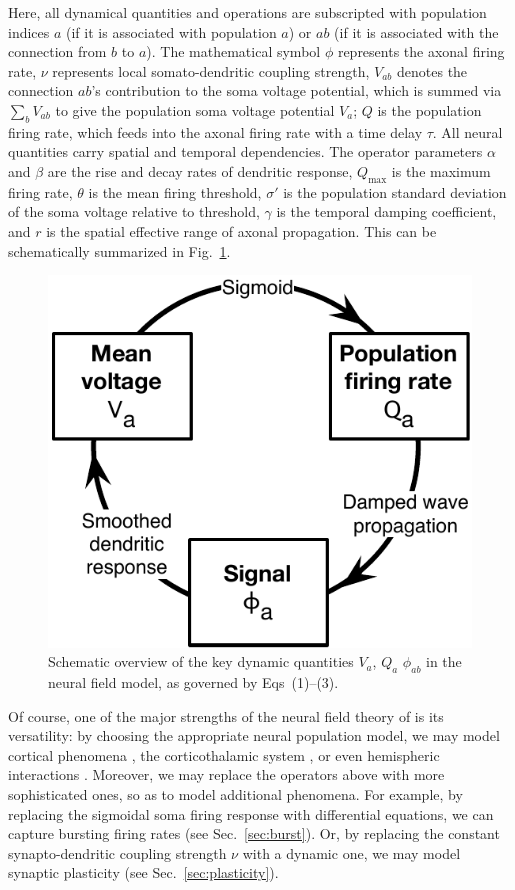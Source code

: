 \documentclass[preprint,review,10pt,authoryear,letterpaper]{elsarticle}
\begin{document}
Here, all dynamical quantities and operations are subscripted with population indices \(a\) (if it is associated with population \(a\)) or \(ab\) (if it is associated with the connection from \(b\) to \(a\)). The mathematical symbol \(\phi\) represents the axonal firing rate, \(\nu\) represents local somato-dendritic coupling strength, \(V_{ab}\) denotes the connection \(ab\)'s contribution to the soma voltage potential, which is summed via \(\sum_b V_{ab}\) to give the population soma voltage potential \(V_a\); \(Q\) is the population firing rate, which feeds into the axonal firing rate with a time delay \(\tau\). All neural quantities carry spatial and temporal dependencies. The operator parameters \(\alpha\) and \(\beta\) are the rise and decay rates of dendritic response, \(Q_\textrm{max}\) is the maximum firing rate, \(\theta\) is the mean firing threshold, \(\sigma'\) is the population standard deviation of the soma voltage relative to threshold, \(\gamma\) is the temporal damping coefficient, and \(r\) is the spatial effective range of axonal propagation. This can be schematically summarized in Fig.~\ref{fig:eirs_cycle}.

\begin{figure}[ht]
\begin{center}
\includegraphics[width=0.40\columnwidth]{EIRS_cycle}
\caption{Schematic overview of the key dynamic quantities \(V_a\), \(Q_a\) \(\phi_{ab}\) in the neural field model, as governed by Eqs~(1)--(3).}
\label{fig:eirs_cycle}
\end{center}
\end{figure}

Of course, one of the major strengths of the neural field theory of \citet{Robinson2005} is its versatility: by choosing the appropriate neural population model, we may model cortical phenomena \citep{}, the corticothalamic system \citep{}, or even hemispheric interactions \citep{}. Moreover, we may replace the operators above with more sophisticated ones, so as to model additional phenomena. For example, by replacing the sigmoidal soma firing response with differential equations, we can capture bursting firing rates (see Sec.~\ref{sec:burst}). Or, by replacing the constant synapto-dendritic coupling strength \(\nu\) with a dynamic one, we may model synaptic plasticity (see Sec.~\ref{sec:plasticity}).
\end{document}
